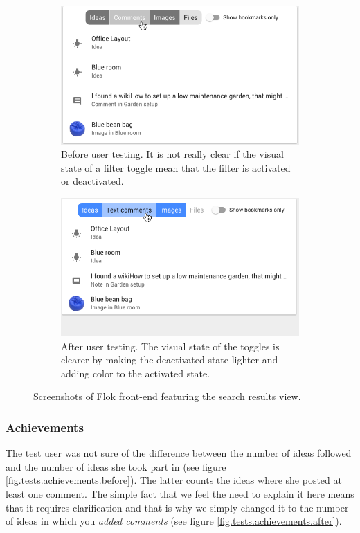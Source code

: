 \documentclass[a4paper,12pt,twoside]{article}
\begin{document}
\begin{figure}[!htb]
    \begin{subfigure}[t]{.495\textwidth}
        \includegraphics[width=\textwidth]{images/user_tests/search_before.png}
        \caption{Before user testing. It is not really clear if the visual state of a filter toggle mean that the filter is activated or deactivated.}
        \label{fig.tests.search.before}
    \end{subfigure}
    \hfill
    \begin{subfigure}[t]{.495\textwidth}
        \includegraphics[width=\textwidth]{images/user_tests/search_after.png}
        \caption{After user testing. The visual state of the toggles is clearer by making the deactivated state lighter and adding color to the activated state.}
        \label{fig.tests.search.after}
    \end{subfigure}
    \caption{Screenshots of Flok front-end featuring the search results view.}
    \label{fig.tests.search}
\end{figure}

\subsubsection*{Achievements}
The test user was not sure of the difference between the number of ideas followed and the number of ideas she took part in (see figure \ref{fig.tests.achievements.before}).
The latter counts the ideas where she posted at least one comment.
The simple fact that we feel the need to explain it here means that it requires clarification and that is why we simply changed it to the number of ideas in which you \emph{added comments} (see figure \ref{fig.tests.achievements.after}).
\end{document}
